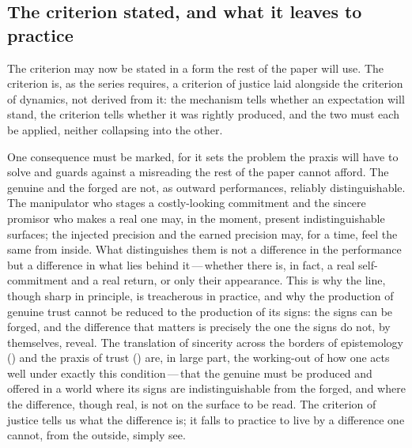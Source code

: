 \subsection{The criterion stated, and what it leaves to practice}
\label{p13:sub:just-criterion}

The criterion may now be stated in a form the rest of the paper will use.  The criterion is, as the series requires, a criterion of justice laid alongside the criterion of dynamics, not derived from it: the mechanism tells whether an expectation will stand, the criterion tells whether it was rightly produced, and the two must each be applied, neither collapsing into the other.

One consequence must be marked, for it sets the problem the praxis will have to solve and guards against a misreading the rest of the paper cannot afford. The genuine and the forged are not, as outward performances, reliably distinguishable. The manipulator who stages a costly-looking commitment and the sincere promisor who makes a real one may, in the moment, present indistinguishable surfaces; the injected precision and the earned precision may, for a time, feel the same from inside. What distinguishes them is not a difference in the performance but a difference in what lies behind it\,---\,whether there is, in fact, a real self-commitment and a real return, or only their appearance. This is why the line, though sharp in principle, is treacherous in practice, and why the production of genuine trust cannot be reduced to the production of its signs: the signs can be forged, and the difference that matters is precisely the one the signs do not, by themselves, reveal. The translation of sincerity across the borders of epistemology () and the praxis of trust () are, in large part, the working-out of how one acts well under exactly this condition\,---\,that the genuine must be produced and offered in a world where its signs are indistinguishable from the forged, and where the difference, though real, is not on the surface to be read. The criterion of justice tells us what the difference is; it falls to practice to live by a difference one cannot, from the outside, simply see.
